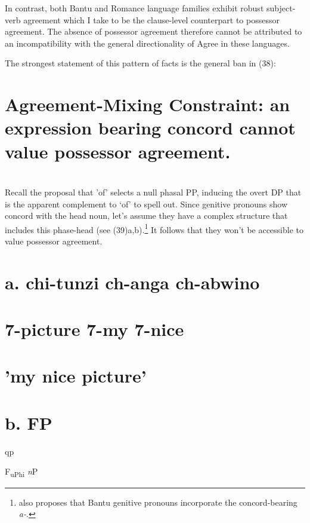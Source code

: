 \documentclass[output=paper
,modfonts
,nonflat]{langsci/langscibook}
\begin{document}
In contrast, both Bantu and Romance language families exhibit robust subject-verb agreement which I take to be the clause-level counterpart to possessor agreement. The absence of possessor agreement therefore cannot be attributed to an incompatibility with the general directionality of Agree in these languages. 

The strongest statement of this pattern of facts is the general ban in (38): 

\section{ Agreement-Mixing Constraint: an expression bearing concord cannot value possessor   agreement.}
\label{bkm:Ref508958220}\section{}

Recall the proposal that 'of' selects a null phasal PP, inducing the overt DP that is the apparent complement to ‘of’ to spell out. Since genitive pronouns show concord with the head noun, let’s assume they have a complex structure that includes this phase-head (see (39)a,b).\footnote{\citealt{Spencer2007} also proposes that Bantu genitive pronouns incorporate the concord-bearing \textit{a-}.} It follows that they won't be accessible to value possessor agreement. 

\section{a.    chi-tunzi     ch\textbf{{}-}anga   ch-abwino}
\label{bkm:Ref511402097}\section{      7-picture   7-my       7-nice}
\section{      'my nice picture'}
\section{}
\section{    b.              FP} 

qp     

F\textsubscript{uPhi}                           \textit{n}P
\end{document}
